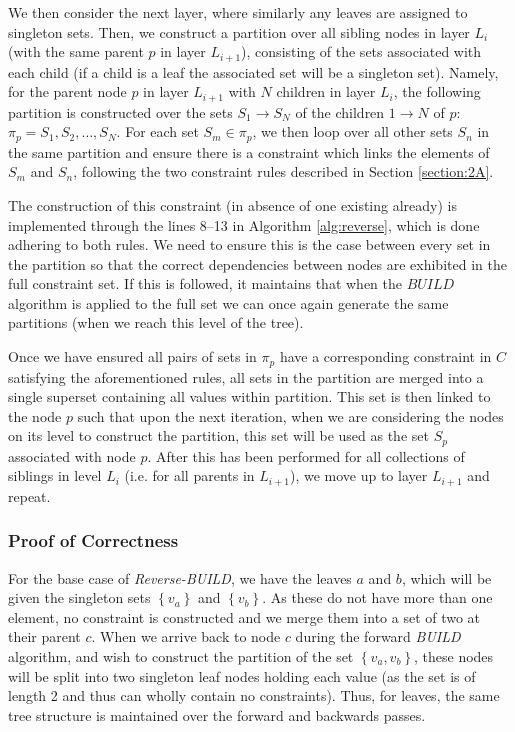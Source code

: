 \documentclass[a4paper, 11pt]{article}
\begin{document}
	We then consider the next layer, where similarly any leaves are assigned to singleton sets. Then, we construct a partition over all sibling nodes in layer $L_{i}$ (with the same parent $p$ in layer $L_{i + 1}$), consisting of the sets associated with each child (if a child is a leaf the associated set will be a singleton set). Namely, for the parent node $p$ in layer $L_{i + 1}$ with $N$ children in layer $L_{i}$, the following partition is constructed over the sets $S_{1} \to S_{N}$ of the children $1 \to N$ of $p$: $\pi_{p} = S_{1}, S_{2}, \dots, S_{N}$. For each set $S_{m} \in \pi_{p}$, we then loop over all other sets $S_{n}$ in the same partition and ensure there is a constraint which links the elements of $S_{m}$ and $S_{n}$, following the two constraint rules described in Section \ref{section:2A}.
	
	The construction of this constraint (in absence of one existing already) is implemented through the lines 8--13 in Algorithm \ref{alg:reverse}, which is done adhering to both rules. We need to ensure this is the case between every set in the partition so that the correct dependencies between nodes are exhibited in the full constraint set. If this is followed, it maintains that when the $BUILD$ algorithm is applied to the full set we can once again generate the same partitions (when we reach this level of the tree).
	
	Once we have ensured all pairs of sets in $\pi_{p}$ have a corresponding constraint in $C$ satisfying the aforementioned rules, all sets in the partition are merged into a single superset containing all values within partition. This set is then linked to the node $p$ such that upon the next iteration, when we are considering the nodes on its level to construct the partition, this set will be used as the set $S_{p}$ associated with node $p$. After this has been performed for all collections of siblings in level $L_{i}$ (i.e. for all parents in $L_{i + 1}$), we move up to layer $L_{i + 1}$ and repeat.
	
	\subsubsection{Proof of Correctness}
	
	For the base case of \emph{Reverse-BUILD}, we have the leaves $a$ and $b$, which will be given the singleton sets $\left\{v_{a}\right\}$ and $\left\{v_{b}\right\}$. As these do not have more than one element, no constraint is constructed and we merge them into a set of two at their parent $c$. When we arrive back to node $c$ during the forward \emph{BUILD} algorithm, and wish to construct the partition of the set $\left\{v_{a}, v_{b}\right\}$, these nodes will be split into two singleton leaf nodes holding each value (as the set is of length 2 and thus can wholly contain no constraints). Thus, for leaves, the same tree structure is maintained over the forward and backwards passes.
	
\end{document}
